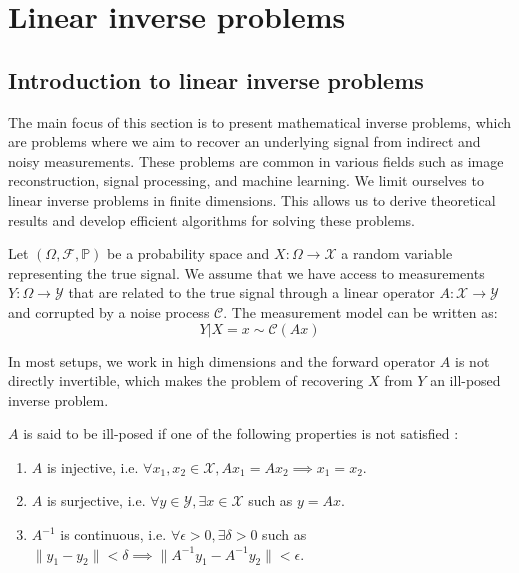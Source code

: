 \section{Linear inverse problems}

\subsection{Introduction to linear inverse problems}

The main focus of this section is to present mathematical inverse problems, which are problems where we aim to recover an underlying signal from indirect and noisy measurements. These problems are common in various fields such as image reconstruction, signal processing, and machine learning.
We limit ourselves to linear inverse problems in finite dimensions. This allows us to derive theoretical results and develop efficient algorithms for solving these problems.

Let $(\Omega, \mathcal{F}, \mathbb{P})$ be a probability space and $X: \Omega \to \mathcal{X}$ a random variable representing the true signal. We assume that we have access to measurements $Y: \Omega \to \mathcal{Y}$ that are related to the true signal through a linear operator $A: \mathcal{X} \to \mathcal{Y}$ and corrupted by a noise process $\mathcal{C}$. The measurement model can be written as:
\begin{equation}
    Y | X=x \sim \mathcal{C}(Ax)
    \label{eq:inverse-problem}
\end{equation}

In most setups, we work in high dimensions and the forward operator $A$ is not directly invertible, which makes the problem of recovering $X$ from $Y$ an ill-posed inverse problem.

\begin{definition}
    $A$ is said to be ill-posed if one of the following properties is not satisfied :
\begin{enumerate}
    \item $A$ is injective, i.e. $\forall x_1, x_2 \in \mathcal{X}, Ax_1 = Ax_2 \implies x_1 = x_2$.
    \item $A$ is surjective, i.e. $\forall y \in \mathcal{Y}, \exists x \in \mathcal{X}$ such as $y = Ax$.
    \item $A^{-1}$ is continuous, i.e. $\forall \epsilon > 0, \exists \delta > 0$ such as $\| y_1 - y_2 \| < \delta \implies \| A^{-1}y_1 - A^{-1}y_2 \| < \epsilon$.
\end{enumerate}
\end{definition}

